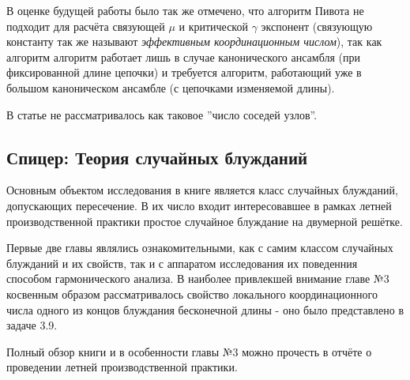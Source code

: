 В оценке будущей работы было так же отмечено, что алгоритм Пивота не подходит для расчёта связующей $\mu$ и критической $\gamma$ экспонент (связующую константу так же называют \textit{эффективным координационным числом}), так как алгоритм алгоритм работает лишь в случае канонического ансамбля (при фиксированной длине цепочки) и требуется алгоритм, работающий уже в большом каноническом ансамбле (с цепочками изменяемой длины).

В статье не рассматривалось как таковое ''число соседей узлов''.


\subsection{Спицер: Теория случайных блужданий}

Основным объектом исследования в книге \cite{Spitser1969} является класс случайных блужданий, допускающих пересечение. 
В их число входит интересовавшее в рамках летней производственной практики простое случайное блуждание на двумерной решётке.


Первые две главы являлись ознакомительными, как с самим классом случайных блужданий и их свойств, так и с аппаратом исследования их поведенния способом гармонического анализа.
В наиболее привлекшей внимание главе №3 косвенным образом рассматривалось свойство локального координационного числа одного из концов блуждания бесконечной длины - оно было представлено в задаче 3.9.


Полный обзор книги и в особенности главы №3 можно прочесть в отчёте о проведении летней производственной практики.

